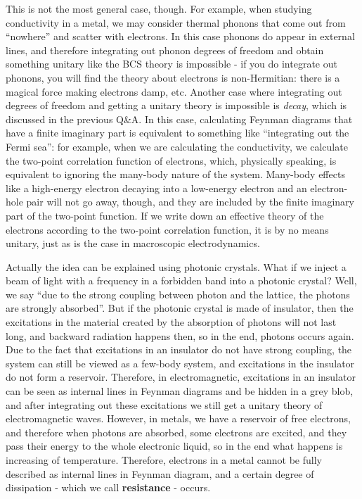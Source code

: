 \documentclass[hyperref, a4paper]{article}
\newcommand*{\concept}[1]{{\textbf{#1}}}
\newenvironment{qanda}{\setlength{\parindent}{0pt}}{\bigskip}
\begin{document}
\begin{qanda}
This is not the most general case, though. For example, when studying conductivity in a metal, we may 
consider thermal phonons that come out from ``nowhere'' and scatter with electrons. In this case phonons
do appear in external lines, and therefore integrating out phonon degrees of freedom and obtain something 
unitary like the BCS theory is impossible - if you do integrate out phonons, you will find the theory 
about electrons is non-Hermitian: there is a magical force making electrons damp, etc. 
Another case where integrating out degrees of freedom and getting a unitary theory is impossible is 
\emph{decay}, which is discussed in the previous Q\&A. In this case, calculating Feynman diagrams  
that have a finite imaginary part is equivalent to something like ``integrating out the Fermi sea'':
for example, when we are calculating the conductivity, we calculate the two-point correlation function
of electrons, which, physically speaking, is equivalent to ignoring the many-body nature of the 
system. Many-body effects like a high-energy electron decaying into a low-energy electron and an
electron-hole pair will not go away, though, and they are included by the finite imaginary part 
of the two-point function. If we write down an effective theory of the electrons according to 
the two-point correlation function, it is by no means unitary, just as is the case in macroscopic 
electrodynamics.

Actually the idea can be explained using photonic crystals. What if we inject a beam of light with a 
frequency in a forbidden band into a photonic crystal? Well, we say ``due to the strong coupling between
photon and the lattice, the photons are strongly absorbed''. But if the photonic crystal is made of 
insulator, then the excitations in the material created by the absorption of photons will not last long,
and backward radiation happens then, so in the end, photons occurs again. Due to 
the fact that excitations in an insulator do not have strong coupling, the system can still be viewed 
as a few-body system, and excitations in the insulator do not form a reservoir. Therefore, in 
electromagnetic, excitations in an insulator can be seen as internal lines in Feynman diagrams and 
be hidden in a grey blob, and after integrating out these excitations we still get a unitary theory 
of electromagnetic waves. However, in metals, we have a reservoir of free electrons, and therefore 
when photons are absorbed, some electrons are excited, and they pass their energy to the whole 
electronic liquid, so in the end what happens is increasing of temperature. Therefore, electrons 
in a metal cannot be fully described as internal lines in Feynman diagram, and a certain degree
of dissipation - which we call \concept{resistance} - occurs.


\end{qanda}
\end{document}
